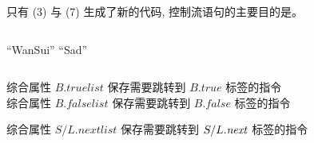 \begin{frame}{}
  \begin{center}
  \end{center}
\end{frame}

\begin{frame}{}

  \begin{center}
    只有 (3) 与 (7) 生成了新的代码, 控制流语句的主要目的是。
  \end{center}
\end{frame}

\begin{frame}[fragile]{}
  \begin{columns}
      \begin{algorithm}[H]
        \begin{algorithmic}[1]
                \State {} ``WanSui''
              \EndWhile
            \Else
              \State {} ``Sad''
            \EndIf
          \EndProcedure
        \end{algorithmic}
      \end{algorithm}
  \end{columns}
\end{frame}

\begin{frame}{}
  \pause
  \pause
\end{frame}

\begin{frame}{}
  \begin{center}
    综合属性 {$B.\mathit{truelist}$ 保存{需要跳转到 $B.\mathit{true}$ 标签}的{指令}} \\[5pt]
    综合属性 {$B.\mathit{falselist}$ 保存{需要跳转到 $B.\mathit{false}$ 标签}的{指令}}


    综合属性 {$S/L.\mathit{nextlist}$} 保存{需要跳转到 $S/L.\mathit{next}$ 标签的指令}
  \end{center}
\end{frame}

